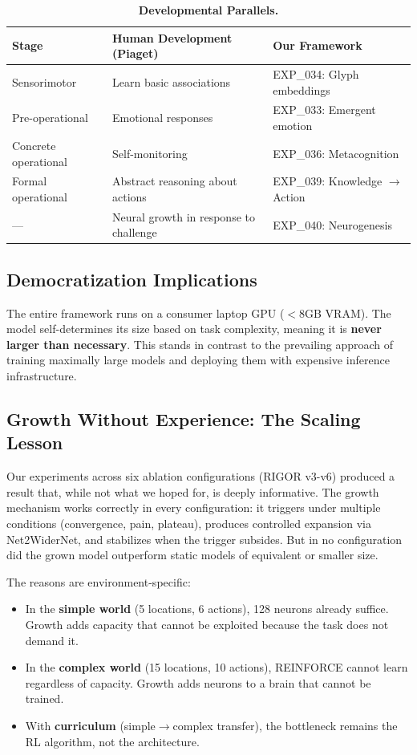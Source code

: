 \documentclass{article}
\begin{document}
\begin{table}[h]
\centering
\caption{\textbf{Developmental Parallels.}}
\label{tab:developmental_parallels}
\begin{tabular}{lll}
\toprule
\textbf{Stage} & \textbf{Human Development (Piaget)} & \textbf{Our Framework} \\
\midrule
Sensorimotor & Learn basic associations & EXP\_034: Glyph embeddings \\
Pre-operational & Emotional responses & EXP\_033: Emergent emotion \\
Concrete operational & Self-monitoring & EXP\_036: Metacognition \\
Formal operational & Abstract reasoning about actions & EXP\_039: Knowledge $\rightarrow$ Action \\
--- & Neural growth in response to challenge & EXP\_040: Neurogenesis \\
\bottomrule
\end{tabular}
\end{table}

\subsection{Democratization Implications}
The entire framework runs on a consumer laptop GPU ($<8$GB VRAM). The model self-determines its size based on task complexity, meaning it is \textbf{never larger than necessary}. This stands in contrast to the prevailing approach of training maximally large models and deploying them with expensive inference infrastructure.

\subsection{Growth Without Experience: The Scaling Lesson}
Our experiments across six ablation configurations (RIGOR v3-v6) produced a result that, while not what we hoped for, is deeply informative. The growth mechanism works correctly in every configuration: it triggers under multiple conditions (convergence, pain, plateau), produces controlled expansion via Net2WiderNet, and stabilizes when the trigger subsides. But in no configuration did the grown model outperform static models of equivalent or smaller size.

The reasons are environment-specific:
\begin{itemize}
    \item In the \textbf{simple world} (5 locations, 6 actions), 128 neurons already suffice. Growth adds capacity that cannot be exploited because the task does not demand it.
    \item In the \textbf{complex world} (15 locations, 10 actions), REINFORCE cannot learn regardless of capacity. Growth adds neurons to a brain that cannot be trained.
    \item With \textbf{curriculum} (simple$\rightarrow$complex transfer), the bottleneck remains the RL algorithm, not the architecture.
\end{itemize}
\end{document}
